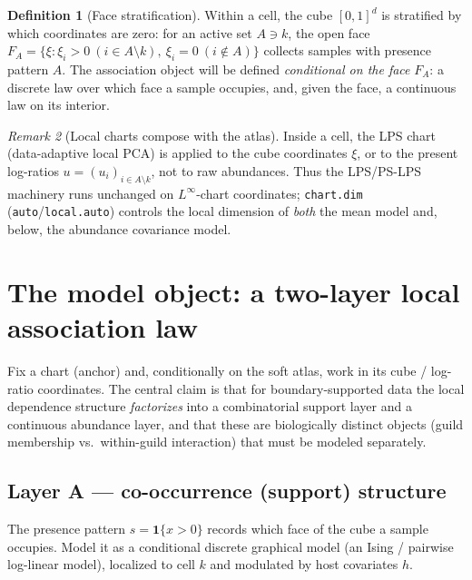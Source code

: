 \documentclass[11pt]{article}
\theoremstyle{definition}
\newtheorem{definition}{Definition}[section]
\theoremstyle{plain}
\theoremstyle{remark}
\newtheorem{remark}[definition]{Remark}
\newcommand{\Linf}{L^{\infty}}
\newcommand{\1}{\mathbf{1}}
\begin{document}
\begin{definition}[Face stratification]\label{def:face}
Within a cell, the cube $[0,1]^d$ is stratified by which coordinates are zero:
for an active set $A\ni k$, the open face
$F_A=\{\xi : \xi_i>0\ (i\in A\setminus k),\ \xi_i=0\ (i\notin A)\}$ collects
samples with presence pattern $A$. The association object will be defined
\emph{conditional on the face} $F_A$: a discrete law over which face a sample
occupies, and, given the face, a continuous law on its interior.
\end{definition}

\begin{remark}[Local charts compose with the atlas]
Inside a cell, the LPS chart (data-adaptive local PCA) is applied to the cube
coordinates $\xi$, or to the present log-ratios $u=(u_i)_{i\in A\setminus k}$,
not to raw abundances. Thus the LPS/PS-LPS machinery runs unchanged on
$\Linf$-chart coordinates; \texttt{chart.dim} (\texttt{auto}/\texttt{local.auto})
controls the local dimension of \emph{both} the mean model and, below, the
abundance covariance model.
\end{remark}

\section{The model object: a two-layer local association law}\label{sec:model}

Fix a chart (anchor) and, conditionally on the soft atlas, work in its cube /
log-ratio coordinates. The central claim is that for boundary-supported data the
local dependence structure \emph{factorizes} into a combinatorial support layer
and a continuous abundance layer, and that these are biologically distinct
objects (guild membership vs.\ within-guild interaction) that must be modeled
separately.

\subsection{Layer A --- co-occurrence (support) structure}\label{sec:layerA}
The presence pattern $s=\1\{x>0\}$ records which face of the cube a sample
occupies. Model it as a conditional discrete graphical model (an Ising / pairwise
log-linear model), localized to cell $k$ and modulated by host covariates $h$.
\end{document}
